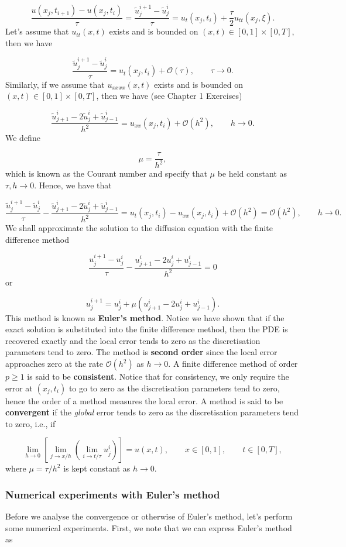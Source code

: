 \documentclass[12pt,a4paper]{article}
\begin{document}
\[
\frac{u(x_j,t_{i+1}) - u(x_j,t_{i})}{\tau} =\frac{\tilde{u}^{i+1}_j - \tilde{u}^i_j}{\tau} = u_t(x_j,t_i) + \frac{\tau}{2}u_{tt}(x_j,\xi).
\]
Let's assume that $u_{tt}(x,t)$ exists and is bounded on $(x,t) \in [0,1]\times[0,T]$, then we have

\[
\frac{\tilde{u}^{i+1}_j - \tilde{u}^i_j}{\tau} = u_t(x_j,t_i) + \mathcal{O}(\tau), \qquad \tau \to 0.
\]
Similarly, if we assume that $u_{xxxx}(x,t)$ exists and is bounded on $(x,t) \in [0,1]\times[0,T]$, then we have (see Chapter 1 Exercises)

\[
\frac{\tilde{u}^{i}_{j+1} - 2\tilde{u}^i_j + \tilde{u}^i_{j-1}}{h^2} = u_{xx}(x_j,t_i) + \mathcal{O}(h^2), \qquad h \to 0.
\]
We define

\[
\mu = \frac{\tau}{h^2},
\]
which is known as the Courant number and specify that $\mu$ be held constant as $\tau, h \to 0$. Hence, we have that

\[
\frac{\tilde{u}^{i+1}_j - \tilde{u}^i_j}{\tau} - \frac{\tilde{u}^{i}_{j+1} - 2\tilde{u}^i_j + \tilde{u}^i_{j-1}}{h^2} = u_t(x_j,t_i) - u_{xx}(x_j,t_i) + \mathcal{O}(h^2) =  \mathcal{O}(h^2), \qquad h \to 0.
\]
We shall approximate the solution to the diffusion equation with the finite difference method

\[
\frac{u^{i+1}_j - u^i_j}{\tau} - \frac{u^{i}_{j+1} - 2u^i_j + u^i_{j-1}}{h^2} = 0
\]
or

\[
u^{i+1}_j = u^i_j + \mu \left( u^{i}_{j+1} - 2u^i_j + u^i_{j-1}  \right).
\]
This method is known as \textbf{Euler's method}. Notice we have shown that if the exact solution is substituted into the finite difference method, then the PDE is recovered exactly and the local error tends to zero as the discretisation parameters tend to zero.  The method is \textbf{second order} since the local error approaches zero at the rate $\mathcal{O}(h^2)$ as $h \to 0$. A finite difference method of order $p \geq 1$ is said to be \textbf{consistent}.  Notice that for consistency, we only require the error at $(x_j,t_i)$  to go to zero as the discretisation parameters tend to zero, hence the order of a method measures the local error.  A method is said to be \textbf{convergent} if the \emph{global} error tends to zero as the discretisation parameters tend to zero, i.e., if

\[
\lim_{h \to 0}\left[\lim_{j \to x/h}\left( \lim_{i \to t/\tau} u^i_j \right)   \right] = u(x,t), \qquad x \in [0, 1], \qquad t \in [0, T],
\]
where $\mu = \tau/h^2$ is kept constant as $h \to 0$.

\subsubsection{Numerical experiments with Euler's method}
Before we analyse the convergence or otherwise of Euler's method, let's perform some numerical experiments.  First, we note that we can express Euler's method as
\end{document}
